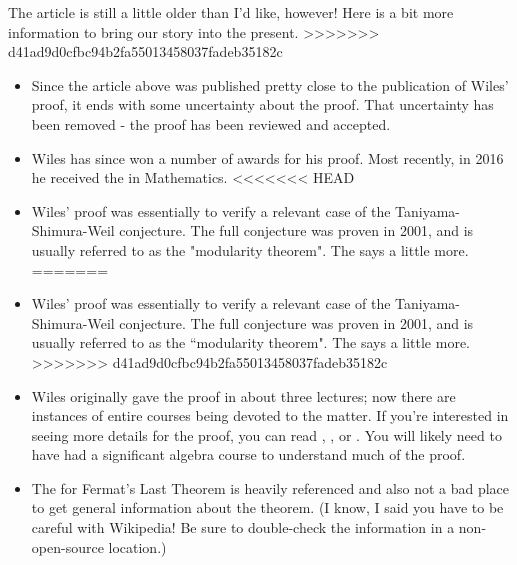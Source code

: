 \documentclass[nooutcomes]{ximera}
\begin{document}
The article is still a little older than I'd like, however!  Here is a bit more information to bring our story into the present.
>>>>>>> d41ad9d0cfbc94b2fa55013458037fadeb35182c
\begin{itemize}
	\item Since the article above was published pretty close to
          the publication of Wiles' proof, it ends with some
          uncertainty about the proof.  That uncertainty has been
          removed - the proof has been reviewed and accepted.
	\item Wiles has since won a number of awards for his proof.  Most recently, in 2016 he received the  in Mathematics.  
<<<<<<< HEAD
	\item Wiles' proof was essentially to verify a relevant case
          of the Taniyama-Shimura-Weil conjecture.  The full
          conjecture was proven in 2001, and is usually referred to as
          the "modularity theorem".  The 
          says a little more.
=======
	\item Wiles' proof was essentially to verify a relevant case of the Taniyama-Shimura-Weil conjecture.  The full conjecture was proven in 2001, and is usually referred to as the ``modularity theorem".  The  says a little more.
>>>>>>> d41ad9d0cfbc94b2fa55013458037fadeb35182c
	\item Wiles originally gave the proof in about three lectures; now there are instances of entire courses being devoted to the matter.  If you're interested in seeing more details for the proof, you can read , , or .  You will likely need to have had a significant algebra course to understand much of the proof.
	\item The  for Fermat's Last Theorem is heavily referenced and also not a bad place to get general information about the theorem.  (I know, I said you have to be careful with Wikipedia!  Be sure to double-check the information in a non-open-source location.)
\end{itemize}
\end{document}
